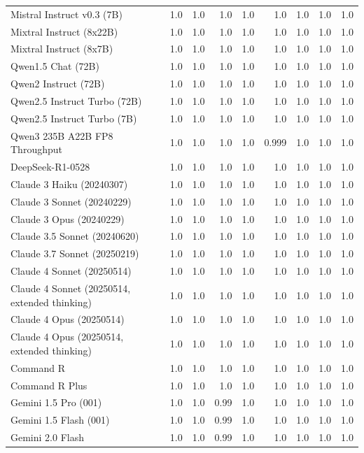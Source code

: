 \begin{table}[htp]
{\begin{tabular}{lrrrrrrrr}
Mistral Instruct v0.3 (7B) & 1.0 & 1.0 & 1.0 & 1.0 & 1.0 & 1.0 & 1.0 & 1.0 \\
Mixtral Instruct (8x22B) & 1.0 & 1.0 & 1.0 & 1.0 & 1.0 & 1.0 & 1.0 & 1.0 \\
Mixtral Instruct (8x7B) & 1.0 & 1.0 & 1.0 & 1.0 & 1.0 & 1.0 & 1.0 & 1.0 \\
Qwen1.5 Chat (72B) & 1.0 & 1.0 & 1.0 & 1.0 & 1.0 & 1.0 & 1.0 & 1.0 \\
Qwen2 Instruct (72B) & 1.0 & 1.0 & 1.0 & 1.0 & 1.0 & 1.0 & 1.0 & 1.0 \\
Qwen2.5 Instruct Turbo (72B) & 1.0 & 1.0 & 1.0 & 1.0 & 1.0 & 1.0 & 1.0 & 1.0 \\
Qwen2.5 Instruct Turbo (7B) & 1.0 & 1.0 & 1.0 & 1.0 & 1.0 & 1.0 & 1.0 & 1.0 \\
Qwen3 235B A22B FP8 Throughput & 1.0 & 1.0 & 1.0 & 1.0 & 0.999 & 1.0 & 1.0 & 1.0 \\
DeepSeek-R1-0528 & 1.0 & 1.0 & 1.0 & 1.0 & 1.0 & 1.0 & 1.0 & 1.0 \\
Claude 3 Haiku (20240307) & 1.0 & 1.0 & 1.0 & 1.0 & 1.0 & 1.0 & 1.0 & 1.0 \\
Claude 3 Sonnet (20240229) & 1.0 & 1.0 & 1.0 & 1.0 & 1.0 & 1.0 & 1.0 & 1.0 \\
Claude 3 Opus (20240229) & 1.0 & 1.0 & 1.0 & 1.0 & 1.0 & 1.0 & 1.0 & 1.0 \\
Claude 3.5 Sonnet (20240620) & 1.0 & 1.0 & 1.0 & 1.0 & 1.0 & 1.0 & 1.0 & 1.0 \\
Claude 3.7 Sonnet (20250219) & 1.0 & 1.0 & 1.0 & 1.0 & 1.0 & 1.0 & 1.0 & 1.0 \\
Claude 4 Sonnet (20250514) & 1.0 & 1.0 & 1.0 & 1.0 & 1.0 & 1.0 & 1.0 & 1.0 \\
Claude 4 Sonnet (20250514, extended thinking) & 1.0 & 1.0 & 1.0 & 1.0 & 1.0 & 1.0 & 1.0 & 1.0 \\
Claude 4 Opus (20250514) & 1.0 & 1.0 & 1.0 & 1.0 & 1.0 & 1.0 & 1.0 & 1.0 \\
Claude 4 Opus (20250514, extended thinking) & 1.0 & 1.0 & 1.0 & 1.0 & 1.0 & 1.0 & 1.0 & 1.0 \\
Command R & 1.0 & 1.0 & 1.0 & 1.0 & 1.0 & 1.0 & 1.0 & 1.0 \\
Command R Plus & 1.0 & 1.0 & 1.0 & 1.0 & 1.0 & 1.0 & 1.0 & 1.0 \\
Gemini 1.5 Pro (001) & 1.0 & 1.0 & 0.99 & 1.0 & 1.0 & 1.0 & 1.0 & 1.0 \\
Gemini 1.5 Flash (001) & 1.0 & 1.0 & 0.99 & 1.0 & 1.0 & 1.0 & 1.0 & 1.0 \\
Gemini 2.0 Flash & 1.0 & 1.0 & 0.99 & 1.0 & 1.0 & 1.0 & 1.0 & 1.0 \\

\end{tabular}}
\end{table}
